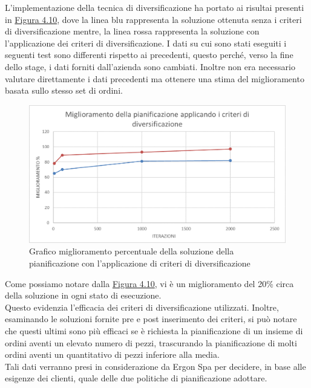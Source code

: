 L'implementazione della tecnica di diversificazione ha portato ai risultai presenti in \hyperref[4.10]{Figura 4.10}, dove la linea blu rappresenta la soluzione ottenuta senza i criteri di diversificazione
mentre, la linea rossa rappresenta la soluzione con l'applicazione dei criteri di diversificazione. I dati su cui sono stati eseguiti i seguenti test sono differenti rispetto ai
precedenti, questo perché, verso la fine dello stage, i dati forniti dall'azienda sono cambiati. Inoltre non era necessario valutare direttamente i dati precedenti ma ottenere
una stima del miglioramento basata sullo stesso set di ordini.

\begin{figure}[H]
	\includegraphics[width=13cm]{immagini/diversificazione.png}
	\centering
    \caption{Grafico miglioramento percentuale della soluzione della pianificazione con l'applicazione di criteri di diversificazione}
    \label{4.10}
\end{figure}

Come possiamo notare dalla \hyperref[4.10]{Figura 4.10}, vi è un miglioramento del 20\% circa della soluzione in ogni stato di esecuzione.\\
Questo evidenzia l'efficacia dei criteri di diversificazione utilizzati.
Inoltre, esaminando le soluzioni fornite pre e post inserimento dei criteri, si può notare che questi ultimi sono più efficaci se è richiesta la pianificazione di un insieme
di ordini aventi un elevato numero di pezzi, trascurando la pianificazione di molti ordini aventi un quantitativo di pezzi inferiore alla media.\\
Tali dati verranno presi in considerazione da Ergon Spa per decidere, in base alle esigenze dei clienti, quale delle due politiche di pianificazione adottare.

